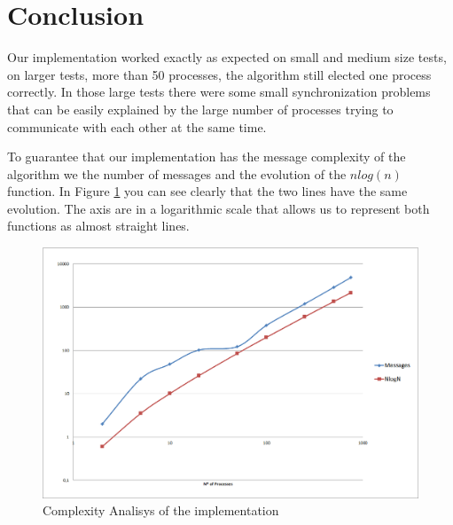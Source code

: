 \section*{Conclusion}

Our implementation worked exactly as expected on small and medium size tests, on larger tests, more than 50 processes, the algorithm still elected one process correctly. In those large tests there were some small synchronization problems that can be easily explained by the large number of processes trying to communicate with each other at the same time.

To guarantee that our implementation has the message complexity of the algorithm we the number of messages and the evolution of the $ n log(n)$ function. In Figure \ref{ComplexityAnalysis} you can see clearly that the two lines have the same evolution. The axis are in a logarithmic scale that allows us to represent both functions as almost straight lines.

\begin{figure}[h] \centering
\includegraphics[scale=0.5]{ComplexityAnalysisPlot}\caption{Complexity Analisys of the implementation} \label{ComplexityAnalysis}
\end{figure}
	